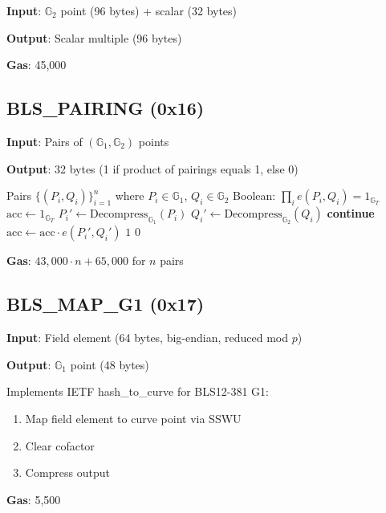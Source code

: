 \documentclass[11pt,a4paper]{article}
\theoremstyle{definition}
\begin{document}
\textbf{Input}: $\mathbb{G}_2$ point (96 bytes) + scalar (32 bytes)

\textbf{Output}: Scalar multiple (96 bytes)

\textbf{Gas}: 45,000

\subsection{BLS\_PAIRING (0x16)}

\textbf{Input}: Pairs of $(\mathbb{G}_1, \mathbb{G}_2)$ points

\textbf{Output}: 32 bytes (1 if product of pairings equals 1, else 0)

\begin{algorithm}
\caption{Pairing Check}
\begin{algorithmic}[1]
\Require Pairs $\{(P_i, Q_i)\}_{i=1}^n$ where $P_i \in \mathbb{G}_1$, $Q_i \in \mathbb{G}_2$
\Ensure Boolean: $\prod_i e(P_i, Q_i) = 1_{\mathbb{G}_T}$
\State $\text{acc} \gets 1_{\mathbb{G}_T}$
    \State $P_i' \gets \text{Decompress}_{\mathbb{G}_1}(P_i)$
    \State $Q_i' \gets \text{Decompress}_{\mathbb{G}_2}(Q_i)$
        \State \textbf{continue} 
    \EndIf
    \State $\text{acc} \gets \text{acc} \cdot e(P_i', Q_i')$
\EndFor
{}
    \Return $1$
\Else
    \Return $0$
\EndIf
\end{algorithmic}
\end{algorithm}

\textbf{Gas}: $43,000 \cdot n + 65,000$ for $n$ pairs

\subsection{BLS\_MAP\_G1 (0x17)}

\textbf{Input}: Field element (64 bytes, big-endian, reduced mod $p$)

\textbf{Output}: $\mathbb{G}_1$ point (48 bytes)

Implements IETF hash\_to\_curve for BLS12-381 G1:
\begin{enumerate}
    \item Map field element to curve point via SSWU
    \item Clear cofactor
    \item Compress output
\end{enumerate}

\textbf{Gas}: 5,500
\end{document}
